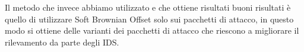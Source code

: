 Il metodo che invece abbiamo utilizzato e che  ottiene risultati buoni risultati è quello di utilizzare Soft Brownian Offset solo sui pacchetti di attacco, in questo modo si ottiene delle varianti dei pacchetti di attacco che riescono a migliorare il rilevamento da parte degli IDS.


%
%
%
%
%
%
%
